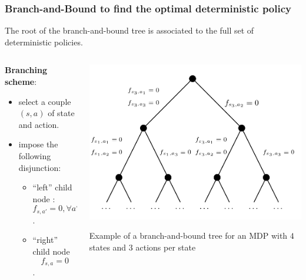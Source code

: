 \documentclass{beamer}
\begin{document}
\begin{frame}
\frametitle{Branch-and-Bound to find the optimal deterministic policy}
The root of the branch-and-bound tree is associated to the full set of deterministic policies.\begin{columns}
\begin{column}{0.5\textwidth}

\textbf{Branching scheme}:
\begin{itemize}
\item select a couple $(s,a)$ of state and action.
\item impose the following disjunction:
\begin{itemize}
\item ``left'' child node : 
$$f_{s,a'}=0, \forall a'\neq a$$.
\item ``right'' child node 
$$f_{s,a}=0$$. 
\end{itemize} 
\end{itemize}


\end{column}
\begin{column}{0.49\textwidth}
	\begin{center}
    \includegraphics[scale=0.195]{images/bb.png}
	\end{center}
Example of a branch-and-bound tree for an MDP with $4$ states and $3$ actions per state	
\end{column}
\end{columns}

\end{frame}
\end{document}
